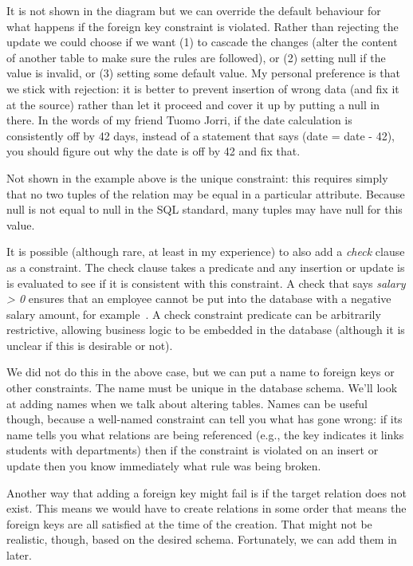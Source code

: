 It is not shown in the diagram but we can override the default behaviour for what happens if the foreign key constraint is violated. Rather than rejecting the update we could choose if we want (1) to cascade the changes (alter the content of another table to make sure the rules are followed), or (2) setting null if the value is invalid, or (3) setting some default value. My personal preference is that we stick with rejection: it is better to prevent insertion of wrong data (and fix it at the source) rather than let it proceed and cover it up by putting a null in there. In the words of my friend Tuomo Jorri, if the date calculation is consistently off by 42 days, instead of a statement that says (date = date - 42), you should figure out why the date is off by 42 and fix that.

Not shown in the example above is the unique constraint: this requires simply that no two tuples of the relation may be equal in a particular attribute. Because null is not equal to null in the SQL standard, many tuples may have null for this value.

It is possible (although rare, at least in my experience) to also add a \textit{check} clause as a constraint. The check clause takes a predicate and any insertion or update is is evaluated to see if it is consistent with this constraint. A check that says \textit{salary > 0} ensures that an employee cannot be put into the database with a negative salary amount, for example~\cite{dsc}. A check constraint predicate can be arbitrarily restrictive, allowing business logic to be embedded in the database (although it is unclear if this is desirable or not).

We did not do this in the above case, but we can put a name to foreign keys or other constraints. The name must be unique in the database schema. We'll look at adding names when we talk about altering tables. Names can be useful though, because a well-named constraint can tell you what has gone wrong: if its name tells you what relations are being referenced (e.g., the key indicates it links students with departments) then if the constraint is violated on an insert or update then you know immediately what rule was being broken.

Another way that adding a foreign key might fail is if the target relation does not exist. This means we would have to create relations in some order that means the foreign keys are all satisfied at the time of the creation. That might not be realistic, though, based on the desired schema. Fortunately, we can add them in later.

